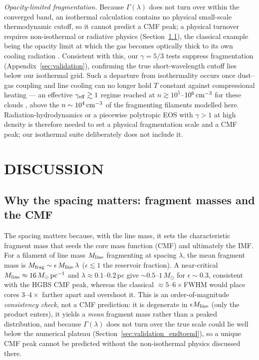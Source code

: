 \documentclass[usenatbib,twoside,twocolumn]{mnras}
\begin{document}
\emph{Opacity-limited fragmentation.} Because $\Gamma(\lambda)$ does not turn over within the converged band, an isothermal calculation contains no physical small-scale thermodynamic cutoff, so it cannot predict a CMF peak; a physical turnover requires non-isothermal or radiative physics (Section~\ref{sec:cmf}), the classical example being the opacity limit at which the gas becomes optically thick to its own cooling radiation \citep{Rees1976,LowLyndenBell1976}. Consistent with this, our $\gamma=5/3$ tests suppress fragmentation (Appendix~\ref{sec:validation}), confirming the true short-wavelength cutoff lies below our isothermal grid. Such a departure from isothermality occurs once dust--gas coupling and line cooling can no longer hold $T$ constant against compressional heating --- an effective $\gamma_{\rm eff}\gtrsim1$ regime reached at $n\gtrsim10^{5}$--$10^{6}\,{\rm cm^{-3}}$ for these clouds \citep{Larson1985,Glover2012}, above the $n\sim10^{4}\,{\rm cm^{-3}}$ of the fragmenting filaments modelled here. Radiation-hydrodynamics or a piecewise polytropic EOS with $\gamma>1$ at high density is therefore needed to set a physical fragmentation scale and a CMF peak; our isothermal suite deliberately does not include it.

\section{DISCUSSION}
\label{sec:discussion}

\subsection{Why the spacing matters: fragment masses and the CMF}
\label{sec:cmf}
The spacing matters because, with the line mass, it sets the characteristic fragment mass that seeds the core mass function (CMF) and ultimately the IMF. For a filament of line mass $M_{\rm line}$ fragmenting at spacing $\lambda$, the mean fragment mass is $M_{\rm frag}\sim\epsilon\,M_{\rm line}\,\lambda$ ($\epsilon\lesssim1$ the reservoir fraction). A near-critical $M_{\rm line}\approx16\,M_\odot\,{\rm pc^{-1}}$ and $\lambda\approx0.1$--$0.2$\,pc give $\sim0.5$--$1\,M_\odot$ for $\epsilon\sim0.3$, consistent with the HGBS CMF peak, whereas the classical $\approx5$--$6\times$FWHM would place cores $3$--$4\times$ farther apart and overshoot it. This is an order-of-magnitude \emph{consistency check}, not a CMF prediction: it is degenerate in $\epsilon M_{\rm line}$ (only the product enters), it yields a \emph{mean} fragment mass rather than a peaked distribution, and because $\Gamma(\lambda)$ does not turn over the true scale could lie well below the numerical plateau (Section~\ref{sec:validation_endtoend}), so a unique CMF peak cannot be predicted without the non-isothermal physics discussed there.
\end{document}
